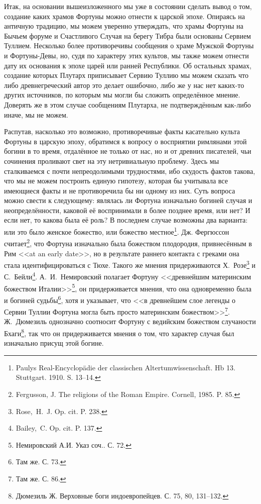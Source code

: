 



Итак, на основании вышеизложенного мы уже в состоянии сделать вывод о том, создание каких храмов Фортуны можно отнести к царской эпохе. Опираясь на античную традицию, мы можем уверенно утверждать, что храмы Фортуны на Бычьем форуме и Счастливого Случая на берегу Тибра были основаны Сервием Туллием. Несколько более противоречивы сообщения о храме Мужской Фортуны и Фортуны-Девы, но, судя по характеру этих культов, мы также можем отнести дату их основания к эпохе царей или ранней Республики. Об остальных храмах, создание которых Плутарх приписывает Сервию Туллию мы можем сказать что либо древнегреческий автор это делает ошибочно, либо же у нас нет каких-то других источников, по которым мы могли бы сложить определённое мнение. Доверять же в этом случае сообщениям Плутарха, не подтверждённым как-либо иначе, мы не можем.

Распутав, насколько это возможно, противоречивые факты касательно культа Фортуны в царскую эпоху, обратимся к вопросу о восприятии римлянами этой богини в то время, отдалённое не только от нас, но и от древних писателей, чьи сочинения проливают свет на эту нетривиальную проблему. Здесь мы сталкиваемся с почти непреодолимыми трудностями, ибо скудость фактов такова, что мы не можем построить единую гипотезу, которая бы учитывала все имеющиеся факты и не противоречила бы ни одному из них. Суть вопроса можно свести к следующему: являлась ли Фортуна изначально богиней случая и неопределённости, каковой её воспринимали в более позднее время, или нет? И если нет, то какова была её роль? В последнем случае возможны два варианта: или это было женское божество, или божество местное\footnote{Paulys Real-Encyclop\"{a}die der classischen Altertumwissenschaft. Hb 13. Stuttgart. 1910. S. 13--14.}. Дж. Фергюссон считает\footnote{Fergusson, J. The religions of the Roman Empire. Cornell, 1985. P. 85.}, что Фортуна изначально была божеством плодородия, привнесённым в Рим <<at an early date>>, но в результате раннего контакта с греками она стала идентифицироваться с Тюхе. Такого же мнения придерживаются Х.~Розе\footnote{Rose,~H.~J. Op. cit. P. 238.} и С.~Бейли\footnote{Bailey,~C. Op. cit. P. 137.}. А.~И.~Немировский полагает Фортуну <<древнейшим материнским божеством Италии>>\footnote{Немировский А.И. Указ соч.. С. 72.}, он придерживается мнения, что она одновременно была и богиней судьбы\footnote{Там же. С. 73.}, хотя и указывает, что <<в древнейшем слое легенды о Сервии Туллии Фортуна могла быть просто материнским божеством>>\footnote{Там же. С. 86.}. Ж.~Дюмезиль однозначно соотносит Фортуну с ведийским божеством случаности Бхаги\footnote{Дюмезиль Ж. Верховные боги индоевропейцев. С. 75, 80, 131--132.}, так что он придерживается мнения о том, что характер случая был изначально присущ этой богине. 

